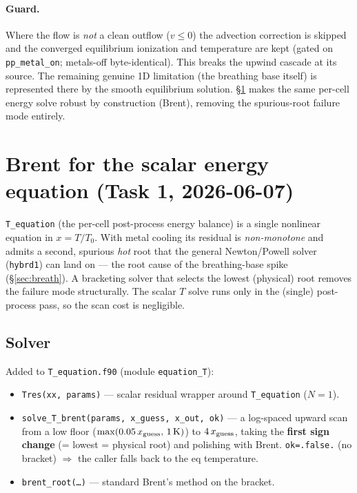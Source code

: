 \documentclass[english,a4paper]{kiseon_memo}
\begin{document}
\paragraph{Guard.} Where the flow is \emph{not} a clean outflow ($v\le0$) the
advection correction is skipped and the converged equilibrium ionization and
temperature are kept (gated on \texttt{pp\_metal\_on}; metals-off byte-identical).
This breaks the upwind cascade at its source. The remaining genuine 1D limitation
(the breathing base itself) is represented there by the smooth equilibrium
solution. \S\ref{sec:task1} makes the same per-cell energy solve robust by
construction (Brent), removing the spurious-root failure mode entirely.

\section{Brent for the scalar energy equation (Task 1, 2026-06-07)}\label{sec:task1}
\texttt{T\_equation} (the per-cell post-process energy balance) is a single
nonlinear equation in $x=T/T_0$. With metal cooling its residual is
\emph{non-monotone} and admits a second, spurious \emph{hot} root that the general
Newton/Powell solver (\texttt{hybrd1}) can land on --- the root cause of the
breathing-base spike (\S\ref{sec:breath}). A bracketing solver that selects the
lowest (physical) root removes the failure mode structurally. The scalar $T$ solve
runs only in the (single) post-process pass, so the scan cost is negligible.

\subsection{Solver}
Added to \texttt{T\_equation.f90} (module \texttt{equation\_T}):
\begin{itemize}
\item \texttt{Tres(xx, params)} --- scalar residual wrapper around
  \texttt{T\_equation} ($N=1$).
\item \texttt{solve\_T\_brent(params, x\_guess, x\_out, ok)} --- a log-spaced
  upward scan from a low floor ($\max(0.05\,x_{\rm guess},\,1\,{\rm K})$) to
  $4\,x_{\rm guess}$, taking the \textbf{first sign change} (= lowest = physical
  root) and polishing with Brent. \texttt{ok=.false.} (no bracket) $\Rightarrow$
  the caller falls back to the eq temperature.
\item \texttt{brent\_root(\ldots)} --- standard Brent's method on the bracket.
\end{itemize}
\end{document}
